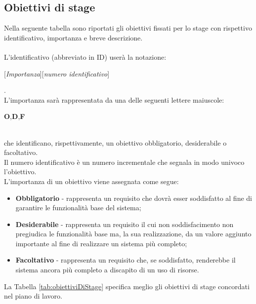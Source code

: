 \subsection{Obiettivi di stage}
Nella seguente tabella sono riportati gli obiettivi fissati per lo stage con rispettivo identificativo, importanza e breve descrizione.\\\\
L'identificativo (abbreviato in ID) userà la notazione:\\
\centerline{[\textit{Importanza}][\textit{numero identificativo}]}.\\
L'importanza sarà rappresentata da una delle seguenti lettere maiuscole:\\
\centerline{\textbf{O},\textbf{D},\textbf{F}}\\
che identificano, rispettivamente, un obiettivo obbligatorio, desiderabile o facoltativo.\\
Il numero identificativo è un numero incrementale che segnala in modo univoco l’obiettivo.\\
L'importanza di un obiettivo viene assegnata come segue:
\begin{itemize}
	\item \textbf{Obbligatorio} - rappresenta un requisito che dovrà esser soddisfatto al fine di garantire le funzionalità base del sistema;
	\item \textbf{Desiderabile} - rappresenta un requisito il cui non soddisfacimento non pregiudica le funzionalità base ma, la sua realizzazione, da un valore aggiunto importante al fine di realizzare un sistema più completo;
	\item \textbf{Facoltativo} - rappresenta un requisito che, se soddisfatto, renderebbe il sistema ancora più completo a discapito di un uso di risorse.
\end{itemize}
La Tabella \ref{tab:obiettiviDiStage} specifica meglio gli obiettivi di stage concordati nel piano di lavoro.
